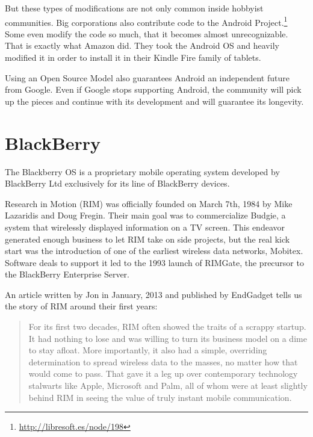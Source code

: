 But these types of modifications are not only common inside hobbyist communities. Big corporations also contribute code to the Android Project.\footnote{\url{http://libresoft.es/node/198}} Some even modify the code so much, that it becomes almost unrecognizable. That is exactly what Amazon did. They took the Android \ac{OS} and heavily modified it in order to install it in their Kindle Fire family of tablets.


Using an Open Source Model also guarantees Android an independent future from Google. Even if Google stops supporting  Android, the community will pick up the pieces and continue with its development and will guarantee its longevity.

\section{BlackBerry}
The Blackberry \ac{OS} is a proprietary mobile operating system developed by BlackBerry Ltd exclusively for its line of BlackBerry devices.

Research in Motion (RIM) was officially founded on March 7th, 1984 by Mike Lazaridis and Doug Fregin. Their main goal was to commercialize Budgie, a system that wirelessly displayed information on a TV screen. This endeavor generated enough business to let RIM take on side projects, but the real kick start was the introduction of one of the earliest wireless data networks, Mobitex. Software deals to support it led to the 1993 launch of RIMGate, the precursor to the BlackBerry Enterprise Server.

An article written by Jon \citeauthor{fingas:2013} in January, 2013 and published by EndGadget tells us the story of RIM around their first years:

\begin{quotation}
For its first two decades, RIM often showed the traits of a scrappy startup. It had nothing to lose and was willing to turn its business model on a dime to stay afloat. More importantly, it also had a simple, overriding determination to spread wireless data to the masses, no matter how that would come to pass. That gave it a leg up over contemporary technology stalwarts like Apple, Microsoft and Palm, all of whom were at least slightly behind RIM in seeing the value of truly instant mobile communication.
\cite{fingas:2013}
\end{quotation}


